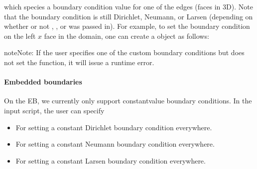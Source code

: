 \documentclass[letterpaper,10pt,english]{sphinxmanual}
\begin{document}
which species a boundary condition value for one of the edges (faces in 3D).
Note that the boundary condition  is still Dirichlet, Neumann, or Larsen (depending on whether or not , , or  was passed in).
For example, to set the boundary condition on the left \(x\) face in the domain, one can create a  object as follows:

\begin{sphinxVerbatim}[commandchars=\\\{\},formatcom=\scriptsize]
 

   \PYG{p}{[}\PYG{p}{]}        
    \PYG{p}{[}\PYG{p}{]}  

  
\end{sphinxVerbatim}

\begin{sphinxadmonition}{note}{Note:}
If the user specifies one of the custom boundary conditions but does not set the function, it will issue a run\sphinxhyphen{}time error.
\end{sphinxadmonition}


\paragraph{Embedded boundaries}
\label{\detokenize{Solvers/RTE:embedded-boundaries}}
On the EB, we currently only support constant\sphinxhyphen{}value boundary conditions.
In the input script, the user can specify
\begin{itemize}
\item {} 
 For setting a constant Dirichlet boundary condition everywhere.

\item {} 
 For setting a constant Neumann boundary condition everywhere.

\item {} 
 For setting a constant Larsen boundary condition everywhere.

\end{itemize}
\end{document}

